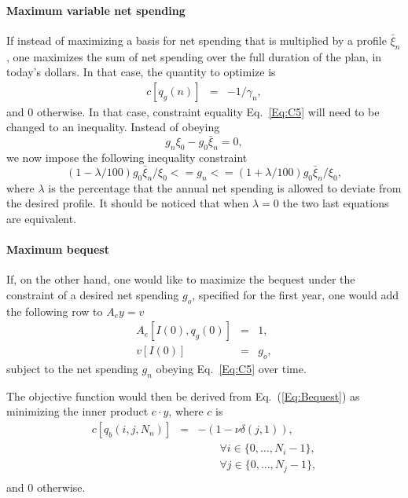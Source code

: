 \documentclass{report}[fleqn,12pt]
\begin{document}
\paragraph*{Maximum variable net spending}
If instead of maximizing a basis for net spending that is multiplied by a profile $\bar{\xi}_n$,
one maximizes the sum of net spending over the full duration
of the plan, in today's dollars. In that case, the quantity to optimize is
\begin{eqnarray}
	c[q_g(n)] &=& -1/\gamma_n,
\end{eqnarray}
and 0 otherwise.
In that case, constraint equality Eq.~\ref{Eq:C5} will need to be changed to an inequality. 
Instead of obeying 
\begin{equation}
	g_n \xi_0 - g_0 \bar{\xi}_n = 0,
\end{equation}
we now impose the following inequality constraint
\begin{equation}
        \label{Eq:C15}
	(1 - \lambda/100) g_0 \bar{\xi}_n/\xi_0 <= g_n <= (1 + \lambda/100) g_0 \bar{\xi}_n/\xi_0 ,
\end{equation}
where $\lambda$ is the percentage that the annual net spending is allowed to deviate
from the desired profile. It should be noticed that when $\lambda = 0$ the two
last equations are equivalent.

\paragraph*{Maximum bequest}
If, on the other hand, one would like to maximize the bequest under the constraint of a desired
net spending $g_o$, specified for the first year,
one would add the following row to $A_ey = v$
\begin{eqnarray}
	\label{Eq:FixedIncome}
	A_e[I(0), q_g(0)] &=& 1, \nonumber \\
	v[I(0)] &=& g_o,
\end{eqnarray}
subject to the net spending $g_n$ obeying Eq.~\ref{Eq:C5} over time.

The objective function would then be derived from Eq.~(\ref{Eq:Bequest}) as
minimizing the inner product $c\cdot y$, where $c$ is
\begin{eqnarray}
	\label{Eq:MaxBequest}
	c[q_b(i, j, N_n)] &=& -(1 - \nu\delta(j, 1)),\\
	&&\qquad\forall i \in \{0,\ldots, N_i-1\},\nonumber\\
	&&\qquad\forall j \in \{0,\ldots, N_j-1\},\nonumber\\
\end{eqnarray}
and 0 otherwise.
\end{document}
